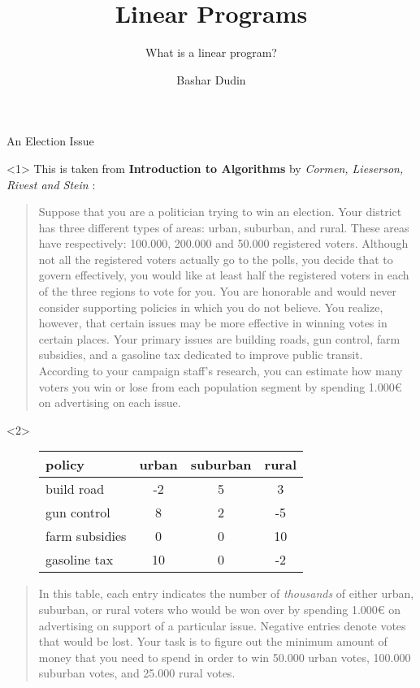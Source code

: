 \documentclass[32pt, aspectratio = 169]{beamer}
\author[BD]{Bashar Dudin}
\institute[]{EPITA}
\title{Linear Programs} %
\subtitle{What is a linear program?}
\begin{document}
\begin{frame}[plain]
\titlepage %
\end{frame}

\begin{frame}{An Election Issue}
    \begin{onlyenv}<1>
      This is taken from \textbf{Introduction to Algorithms} by
      \emph{Cormen, Lieserson, Rivest and Stein} :
        \begin{quotation}
          Suppose that you are a politician trying to win an
          election. Your district has three different types of areas:
          urban, suburban, and rural. These areas have respectively:
          100.000, 200.000 and 50.000 registered voters. Although not
          all the registered voters actually go to the polls, you
          decide that to govern effectively, you would like at least
          half the registered voters in each of the three regions to
          vote for you. You are honorable and would never consider
          supporting policies in which you do not believe. You
          realize, however, that certain issues may be more effective
          in winning votes in certain places. Your primary issues are
          building roads, gun control, farm subsidies, and a gasoline
          tax dedicated to improve public transit. According to your
          campaign staff's research, you can estimate how many voters
          you win or lose from each population segment by spending
          1.000€ on advertising on each issue.
        \end{quotation}
    \end{onlyenv}
    \begin{onlyenv}<2>
        \begin{figure}
            \begin{tabular}{l|ccc}
                policy & urban & suburban & rural \\
                \hline
                build road & -2 & 5 & 3 \\
                gun control & 8 & 2 & -5 \\
                farm subsidies & 0 & 0 & 10 \\
                gasoline tax & 10 & 0 & -2
            \end{tabular}
        \end{figure}
        \begin{quotation}
          In this table, each entry indicates the number of
          \emph{thousands} of either urban, suburban, or rural voters
          who would be won over by spending 1.000€ on advertising on
          support of a particular issue. Negative entries denote votes
          that would be lost. Your task is to figure out the minimum
          amount of money that you need to spend in order to win
          50.000 urban votes, 100.000 suburban votes, and 25.000 rural
          votes.
        \end{quotation}
    \end{onlyenv}
\end{frame}
\end{document}
